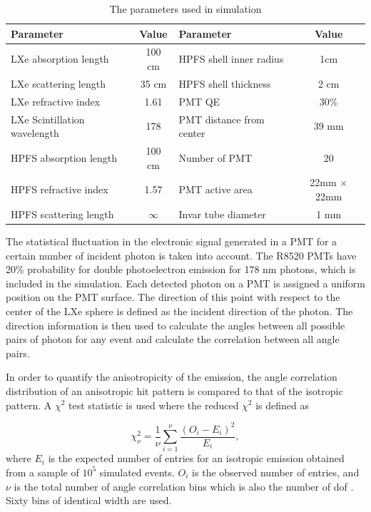 \begin{table}[h]
  \centering
  \begin{tabular}{|l c||l c|}
  \hline
  Parameter & Value & Parameter & Value \\
  \hline
  LXe absorption length & 100 cm & HPFS shell inner radius & 1cm \\
  LXe scattering length & 35 cm & HPFS shell thickness & 2 cm\\
  LXe refractive index & 1.61  & PMT QE &  30\% \\
  LXe Scintillation wavelength & 178& PMT distance from center & 39 mm\\
  HPFS absorption length & 100 cm  & Number of PMT & 20 \\
  HPFS refractive index & 1.57 & PMT active area & 22mm $\times$ 22mm \\
  HPFS scattering length & $\infty$ & Invar tube diameter & 1 mm\\
  \hline
 \end{tabular}
   \caption{The parameters used in simulation}
  \label{tab:OptPar}

\end{table}


The statistical fluctuation 
in the electronic signal generated in a PMT for a certain number of incident photon is 
taken into account. The R8520 PMTs have 20\% probability 
for double photoelectron emission for 178 nm photons, which is included in the simulation.
Each detected photon on a PMT is assigned a uniform position on the PMT surface. 
The direction of this point with respect 
to the center of the LXe sphere is defined as the incident direction of the photon. The direction information 
is then used to calculate the angles between all possible pairs of photon for any event and 
calculate the correlation between all angle pairs. 

In order to quantify the anisotropicity of the emission, 
the angle correlation distribution of an anisotropic hit pattern is compared to that of the isotropic 
pattern. A $\chi^2$ test statistic is used where the reduced $\chi^2$ is defined as 

\begin{equation}
\chi^2_\nu = \frac{1}{\nu} \sum^{\nu}_{i=1} \frac{(O_i - E_i)^2}{E_i},
\label{redchi2}
\end{equation}
where $E_i$ is the expected number of entries for an isotropic emission obtained from a sample of $10^5$ simulated events. 
$O_i$ is the observed number of entries, and $\nu$ is the total number of angle correlation bins 
which is also the number of dof . Sixty bins of identical width are used.


